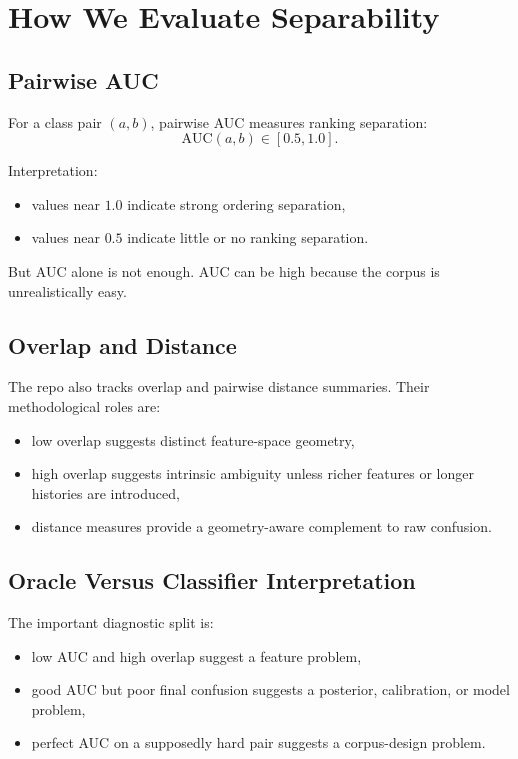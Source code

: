 \documentclass[11pt]{article}
\begin{document}
\section{How We Evaluate Separability}

\subsection{Pairwise AUC}

For a class pair $(a,b)$, pairwise AUC measures ranking separation:
\begin{equation}
    \mathrm{AUC}(a,b) \in [0.5, 1.0].
\end{equation}

Interpretation:
\begin{itemize}[leftmargin=1.5em]
    \item values near $1.0$ indicate strong ordering separation,
    \item values near $0.5$ indicate little or no ranking separation.
\end{itemize}

But AUC alone is not enough. AUC can be high because the corpus is unrealistically
easy.

\subsection{Overlap and Distance}

The repo also tracks overlap and pairwise distance summaries. Their methodological
roles are:
\begin{itemize}[leftmargin=1.5em]
    \item low overlap suggests distinct feature-space geometry,
    \item high overlap suggests intrinsic ambiguity unless richer features or
    longer histories are introduced,
    \item distance measures provide a geometry-aware complement to raw confusion.
\end{itemize}

\subsection{Oracle Versus Classifier Interpretation}

The important diagnostic split is:
\begin{itemize}[leftmargin=1.5em]
    \item low AUC and high overlap suggest a feature problem,
    \item good AUC but poor final confusion suggests a posterior, calibration,
    or model problem,
    \item perfect AUC on a supposedly hard pair suggests a corpus-design
    problem.
\end{itemize}
\end{document}
